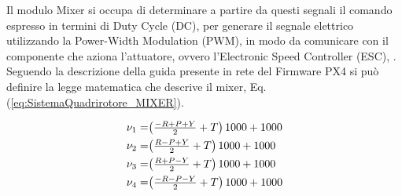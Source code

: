 Il modulo Mixer si occupa di determinare a partire da questi segnali il comando espresso in termini di Duty Cycle (DC), per generare il segnale elettrico utilizzando la Power-Width Modulation (PWM), in modo da comunicare con il componente che aziona l'attuatore, ovvero l'Electronic Speed Controller (ESC), \cite{DesTestCarm}. Seguendo la descrizione della guida presente in rete del Firmware PX4 si può definire la legge matematica che descrive il mixer, Eq. (\ref{eq:SistemaQuadrirotore_MIXER}).

\begin{equation}\label{eq:SistemaQuadrirotore_MIXER}
	\begin{array}{r@{}l}
		\nu_1 = & \left(\frac{-R +P +Y}{2} + T\right) 1000 + 1000 \\[1ex]
		\nu_2 = & \left(\frac{R -P +Y}{2} + T\right) 1000 + 1000 \\[1ex]
		\nu_3 = & \left(\frac{R +P -Y}{2} + T\right) 1000 + 1000 \\[1ex]
		\nu_4 = & \left(\frac{-R -P -Y}{2} + T\right) 1000 + 1000 \\[1ex]
	\end{array}
\end{equation}
